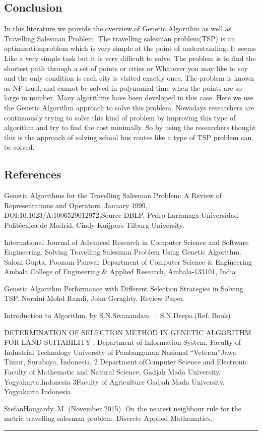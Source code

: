 \documentclass{article}
\begin{document}
\subsection*{\hfil Conclusion \hfil}
In this literature we provide the overview of Genetic Algorithm as well as Travelling Salesman Problem. The travelling salesman problem(TSP) is an optimizationproblem which is very simple at the point of understanding. It seems Like a very simple task but it is very difficult to solve. The problem is to find the shortest path through a set of points or cities or Whatever you may like to say and the only condition is each city is visited exactly once. The problem is known as NP-hard, and cannot be solved in polynomial time when the points are so large in number. Many algorithms have been developed in this case. Here we use the Genetic Algorithm approach to solve this problem. Nowadays researchers are continuously trying to solve this kind of problem by improving this type of algorithm and try to find the cost minimally. So by using the researchers thought this is the approach of solving school bus routes like a type of TSP problem can be solved.


\subsection*{\hfil References \hfil}

\par[1] Genetic Algorithms for the Travelling Salesman Problem: A Review of Representations and Operators. January 1999, DOI:10.1023/A:1006529012972,Source DBLP. Pedro Larranaga-Universidad Politécnica de Madrid, Cindy Kuijpers-Tilburg University. \par[2] International Journal of Advanced Research in Computer Science and Software Engineering. Solving Travelling Salesman Problem Using Genetic Algorithm. Saloni Gupta, Poonam Panwar Department of Computer Science & Engineering Ambala College of Engineering & Applied Research, Ambala-133101, India\par[3]  Genetic Algorithm Performance with Different Selection Strategies in Solving TSP. Noraini Mohd Razali, John Geraghty. Review Paper. \par[4]  Introduction to Algorithm, by S.N.Sivanandam · S.N.Deepa.(Ref. Book)\par[5] DETERMINATION OF SELECTION METHOD IN GENETIC ALGORITHM FOR LAND SUITABILITY , Department of Information System, Faculty of Industrial Technology University of Pembangunan Nasional “Veteran”Jawa Timur, Surabaya, Indonesia, 2 Department ofComputer Science and Electronic Faculty of Mathematic and Natural Science, Gadjah Mada University, Yogyakarta,Indonesia 3Faculty of Agriculture Gadjah Mada University, Yogyakarta Indonesia\par[6] StefanHougardy, M. (November 2015). On the nearest neighbour rule for the metric travelling salesman problem. Discrete Applied Mathematics,

\noindent
\rule{\textwidth}{0.5pt}
\end{document}

